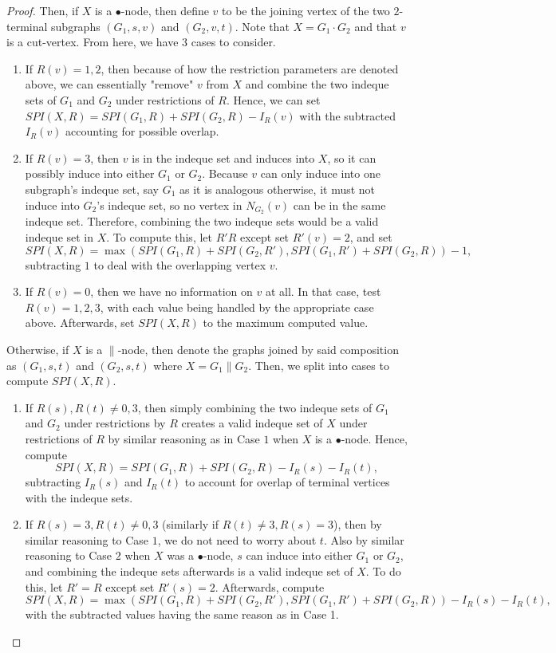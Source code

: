\documentclass{article}
\begin{document}
\begin{proof}
Then, if $X$ is a $\bullet$-node, then define $v$ to be the joining vertex of the two $2$-terminal subgraphs $(G_1, s,v)$ and $(G_2, v, t)$. Note that $X = G_1 \cdot G_2$ and that $v$ is a cut-vertex. From here, we have $3$ cases to consider. 
\begin{enumerate}[label=\textbf{Case \arabic*.},leftmargin=*]
\item If $R(v) = 1,2$, then because of how the restriction parameters are denoted above, we can essentially "remove" $v$ from $X$ and combine the two indeque sets of $G_1$ and $G_2$ under restrictions of $R$. Hence, we can set $SPI(X, R) = SPI(G_1, R) + SPI(G_2,R) - I_R(v)$ with the subtracted $I_R(v)$ accounting for possible overlap.
\item If $R(v) = 3$, then $v$ is in the indeque set and induces into $X$, so it can possibly induce into either $G_1$ or $G_2$. Because $v$ can only induce into one subgraph's indeque set, say $G_1$ as it is analogous otherwise, it must not induce into $G_2$'s indeque set, so no vertex in $N_{G_2}(v)$ can be in the same indeque set. Therefore, combining the two indeque sets would be a valid indeque set in $X$. To compute this, let $R' R$ except set $R'(v) = 2$, and set $$SPI(X,R) =\max(SPI(G_1, R) + SPI(G_2, R'), SPI(G_1, R') + SPI(G_2, R)) - 1,$$ subtracting $1$ to deal with the overlapping vertex $v$.
\item If $R(v) = 0$, then we have no information on $v$ at all. In that case, test $R(v) = 1, 2,3$, with each value being handled by the appropriate case above. Afterwards, set $SPI(X, R)$ to the maximum computed value.
\end{enumerate}

Otherwise, if $X$ is a $\parallel$-node, then denote the graphs joined by said composition as $(G_1, s, t)$ and $(G_2,s,t)$ where $X = G_1 \parallel G_2$. Then, we split into cases to compute $SPI(X, R)$.

\begin{enumerate}[label=\textbf{Case \arabic*.},leftmargin=*]
\item If $R(s), R(t) \neq 0,3$, then simply combining the two indeque sets of $G_1$ and $G_2$ under restrictions by $R$ creates a valid indeque set of $X$ under restrictions of $R$ by similar reasoning as in Case $1$ when $X$ is a $\bullet$-node. Hence, compute $$SPI(X, R) = SPI(G_1, R) + SPI(G_2, R) - I_R(s) - I_R(t),$$ subtracting $I_R(s)$ and $I_R(t)$ to account for overlap of terminal vertices with the indeque sets.

\item If $R(s) = 3, R(t) \neq 0,3$ (similarly if $R(t) \neq 3, R(s) = 3$), then by similar reasoning to Case $1$, we do not need to worry about $t$. Also by similar reasoning to Case $2$ when $X$ was a $\bullet$-node, $s$ can induce into either $G_1$ or $G_2$, and combining the indeque sets afterwards is a valid indeque set of $X$. To do this, let $R' = R$ except set $R'(s) = 2$. Afterwards, compute $$SPI(X, R) = \max(SPI(G_1, R) + SPI(G_2, R'), SPI(G_1, R') + SPI(G_2, R))  - I_R(s) - I_R(t),$$ with the subtracted values having the same reason as in Case 1.


\end{enumerate}
\end{proof}
\end{document}
